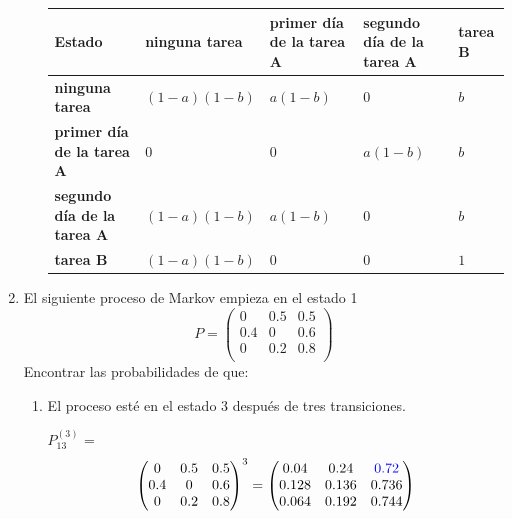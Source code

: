 \documentclass{templateNote}
\begin{document}
\begin{enumerate}[start = 2]
\begin{enumerate}[label = \alph*)]
\begin{center}
            \begin{table}[h]
                \centering
                \begin{tabularx}{\textwidth}{|X|X|X|X|X|}
                    \hline
                    \textbf{Estado} & \textbf{ninguna tarea} & \textbf{primer día de la tarea A} & \textbf{segundo día de la tarea A} & \textbf{tarea B} \\ \hline
                    \textbf{ninguna tarea} & $(1-a)(1-b)$ & $a(1-b)$ & $0$ & $b$ \\ \hline
                    \textbf{primer día de la tarea A} & $0$ & $0$ & $a(1-b)$ & $b$ \\ \hline
                    \textbf{segundo día de la tarea A} & $(1-a)(1-b)$ & $a(1-b)$ & $0$ & $b$ \\ \hline
                    \textbf{tarea B} & $(1-a)(1-b)$ & $0$ & $0$ & $1$ \\ \hline
                \end{tabularx}
            \end{table}

        \end{center}

        
    
    \end{enumerate}

    \newpage
    \item El siguiente proceso de Markov empieza en el estado 1
    \[
    P = \begin{pmatrix}
        0   & 0.5 & 0.5 \\
        0.4 & 0   & 0.6 \\
        0   & 0.2 & 0.8 \\
    \end{pmatrix}
    \]
    Encontrar las probabilidades de que:
    \begin{enumerate}[label=\alph*)]
        \item El proceso esté en el estado 3 después de tres transiciones.

        $P_{13}^{(3)}$ = 
        \[
        \begin{pmatrix}
            0   & 0.5 & 0.5 \\
            0.4 & 0   & 0.6 \\
            0   & 0.2 & 0.8 \\
        \end{pmatrix}^3
        =
        \begin{pmatrix}
            0.04 & 0.24 & \textcolor{blue}{0.72} \\
            0.128 & 0.136 & 0.736 \\ 
            0.064 & 0.192 & 0.744 \\
        \end{pmatrix}
        \]


\end{enumerate}
\end{enumerate}
\end{document}
